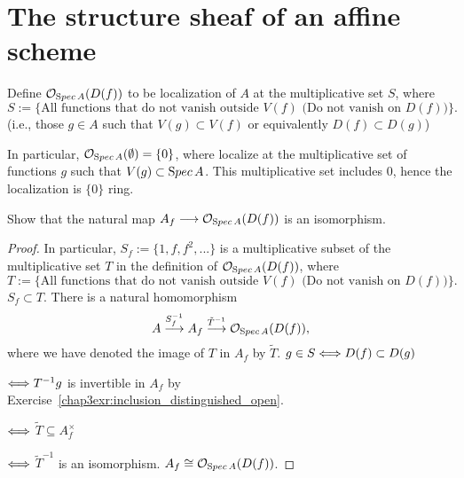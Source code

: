\documentclass[11pt,fleqn]{book}
\begin{document}
\section{The structure sheaf of an affine scheme
}
\begin{definition}
Define ${\cal O}_{{\text Spec\,} A}(D(f))$ to be localization of $A$ at the multiplicative set $S$, where
$$
S:=\{\text{All functions that do not vanish outside $V(f)$ (Do not vanish on $D(f))$}\}.
$$
(i.e., those $g\in A$ such that $V(g)\subset V(f)$ or equivalently $D(f)\subset D(g)$)
\end{definition}
In particular, ${\cal O}_{{\text Spec\,} A}(\emptyset)=\{0\}$, where localize at the multiplicative set of functions $g$ such that $V(g)\subset {\text Spec\,} A$. This multiplicative set includes $0$, hence the localization is $\{0\}$ ring.

\begin{exr}
Show that the natural map $A_f \longrightarrow {\cal O}_{{\text Spec\,} A}(D(f))$ is an isomorphism.
\end{exr}
\begin{proof}
In particular, $S_f:=\{1,f,f^2,...\}$ is a multiplicative subset of the multiplicative set $T$ in the definition of ${\cal O}_{{\text Spec\,} A}(D(f))$, where 
$$
T:=\{\text{All functions that do not vanish outside $V(f)$ (Do not vanish on $D(f))$}\}.
$$
$S_f\subset T$.
There is a natural homomorphism 
$$
A\overset{S_f^{-1}}{\longrightarrow}A_f\overset{\tilde{T}^{-1}}{\longrightarrow}{\cal O}_{{\text Spec\,} A}(D(f)), 
$$
where we have denoted the image of $T$ in $A_f$ by $\tilde{T}$. $g\in S\Longleftrightarrow D(f)\subset D(g)$

$\Longleftrightarrow T^{-1}g$ is invertible in $A_f$ by Exercise~\ref{chap3exr:inclusion_distinguished_open}.

$\Longleftrightarrow$ $\tilde{T}\subseteq A_f^\times$

$\Longleftrightarrow$ $\tilde{T}^{-1}$ is an isomorphism. $A_f\cong {\cal O}_{{\text Spec\,} A}(D(f))$.
\end{proof}
\end{document}
